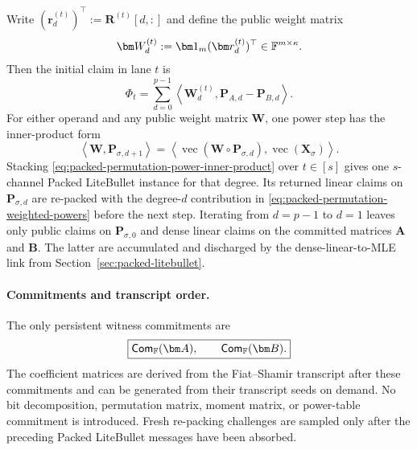 \documentclass[runningheads]{llncs}
\begin{document}
Write \((\bm r_d^{(t)})^\top:=\bm R^{(t)}[d,:]\) and define the public
weight matrix
\[
    \bm W_d^{(t)}:=\bm 1_m(\bm r_d^{(t)})^\top
      \in\Field^{m\times\kappa}.
\]
Then the initial claim in lane \(t\) is
\begin{equation}
    \Phi_t
      =
      \sum_{d=0}^{p-1}
      \left\langle
        \bm W_d^{(t)},
        \bm P_{A,d}-\bm P_{B,d}
      \right\rangle.
\label{eq:packed-permutation-weighted-powers}
\end{equation}
For either operand and any public weight matrix \(\bm W\), one power
step has the inner-product form
\begin{equation}
    \left\langle\bm W,\bm P_{\sigma,d+1}\right\rangle
      =
      \left\langle
        \operatorname{vec}(\bm W\circ\bm P_{\sigma,d}),
        \operatorname{vec}(\bm X_\sigma)
      \right\rangle.
\label{eq:packed-permutation-power-inner-product}
\end{equation}
Stacking \eqref{eq:packed-permutation-power-inner-product} over
\(t\in[s]\) gives one \(s\)-channel Packed LiteBullet instance for
that degree.  Its returned linear claims on \(\bm P_{\sigma,d}\) are
re-packed with the degree-\(d\) contribution in
\eqref{eq:packed-permutation-weighted-powers} before the next step.
Iterating from \(d=p-1\) to \(d=1\) leaves only public claims on
\(\bm P_{\sigma,0}\) and dense linear claims on the committed matrices
\(\bm A\) and \(\bm B\).  The latter are accumulated and discharged by
the dense-linear-to-MLE link from Section~\ref{sec:packed-litebullet}.

\paragraph{Commitments and transcript order.}
The only persistent witness commitments are
\begin{equation}
    \boxed{
      \mathsf{Com}_{\Field}(\bm A),
      \qquad
      \mathsf{Com}_{\Field}(\bm B).
    }
\label{eq:packed-permutation-commitments}
\end{equation}
The coefficient matrices are derived from the Fiat--Shamir transcript
after these commitments and can be generated from their transcript
seeds on demand.  No bit decomposition, permutation matrix, moment
matrix, or power-table commitment is introduced.  Fresh re-packing
challenges are sampled only after the preceding Packed LiteBullet
messages have been absorbed.
\end{document}
